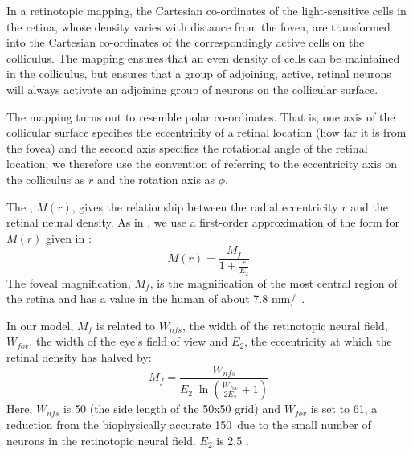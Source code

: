 \documentclass{frontiersSCNS}
\begin{document}
In a retinotopic mapping, the Cartesian co-ordinates of the
light-sensitive cells in the retina, whose density varies with
distance from the fovea, are transformed into the Cartesian
co-ordinates of the correspondingly active cells on the
colliculus. The mapping ensures that an even density of cells can be
maintained in the colliculus, but ensures that a group of adjoining,
active, retinal neurons will always activate an adjoining group of
neurons on the collicular surface.

The mapping turns out to resemble polar co-ordinates. That is, one
axis of the collicular surface specifies the eccentricity of a retinal
location (how far it is from the fovea) and the second axis specifies
the rotational angle of the retinal location; we therefore use the
convention of referring to the eccentricity axis on the colliculus as
$r$ and the rotation axis as $\phi$.

The , $M(r)$, gives the relationship
between the radial eccentricity $r$ and the retinal neural density. As
in
\cite{cope_basal_2017}, we use a first-order approximation of the form
for $M(r)$ given in \cite{rovamo_estimation_1979}:
\begin{equation} \label{eq:cmf}
M(r) = \frac{M_f}{1+\frac{r}{E_2}}
\end{equation}
The foveal magnification, $M_f$, is the magnification of the most
central region of the retina and has a value in the human of about 7.8
mm/\dg~\citep{rovamo_estimation_1979}.

In our model, $M_f$ is related to $W_{nfs}$, the width of the
retinotopic neural field, $W_{fov}$, the width of the eye's field of
view and $E_2$, the eccentricity at which the retinal density has
halved by:
\begin{equation} \label{eq:fm}
   M_f = \frac {W_{nfs}} {E_2\;\ln\left(\frac{W_{fov}}{2 E_2} + 1\right)}
\end{equation}
Here, $W_{nfs}$ is 50 (the side length of the 50x50 grid) and
$W_{fov}$ is set to 61\dg, a reduction from the biophysically accurate
150\dg~due to the small number of neurons in the retinotopic neural
field. $E_2$ is
2.5 \citep{cope_basal_2017,slotnick_electrophysiological_2001}.

\end{document}
